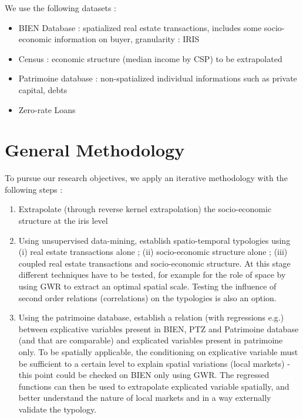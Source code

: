 We use the following datasets : 
\begin{itemize}
\item BIEN Database : spatialized real estate transactions, includes some socio-economic information on buyer, granularity : IRIS
\item Census : economic structure (median income by CSP) to be extrapolated
\item Patrimoine database : non-spatialized individual informations such as private capital, debts
\item Zero-rate Loans
\end{itemize}


\section{General Methodology}

To pursue our research objectives, we apply an iterative methodology with the following steps :
\begin{enumerate}
\item Extrapolate (through reverse kernel extrapolation) the socio-economic structure at the iris level
\item Using unsupervised data-mining, establish spatio-temporal typologies using (i) real estate transactions alone ; (ii) socio-economic structure alone ; (iii) coupled real estate transactions and socio-economic structure. At this stage different techniques have to be tested, for example for the role of space by using GWR to extract an optimal spatial scale. Testing the influence of second order relations (correlations) on the typologies is also an option.
\item Using the patrimoine database, establish a relation (with regressions e.g.) between explicative variables present in BIEN, PTZ and Patrimoine database (and that are comparable) and explicated variables present in patrimoine only. To be spatially applicable, the conditioning on explicative variable must be sufficient to a certain level to explain spatial variations (local markets) - this point could be checked on BIEN only using GWR. The regressed functions can then be used to extrapolate explicated variable spatially, and better understand the nature of local markets and in a way externally validate the typology.
\end{enumerate}





